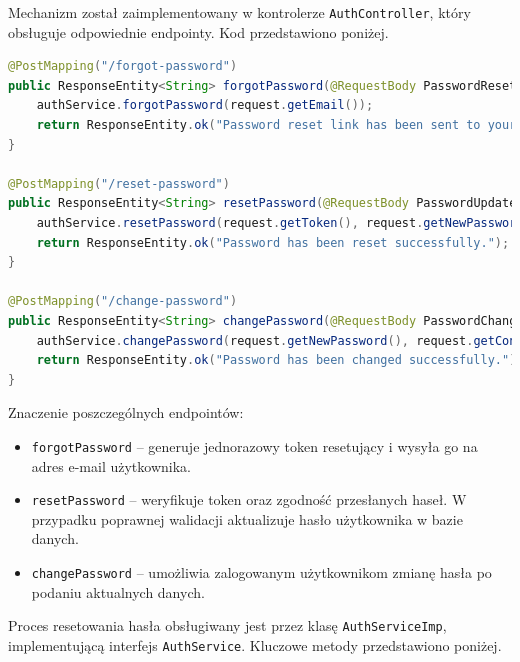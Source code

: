 Mechanizm został zaimplementowany w kontrolerze \texttt{AuthController}, który obsługuje odpowiednie endpointy. Kod przedstawiono poniżej.

\begin{lstlisting}[language=Java, style=JavaStyle, caption=Fragment klasy \texttt{AuthController}]
@PostMapping("/forgot-password")
public ResponseEntity<String> forgotPassword(@RequestBody PasswordResetRequest request) {
    authService.forgotPassword(request.getEmail());
    return ResponseEntity.ok("Password reset link has been sent to your email.");
}

@PostMapping("/reset-password")
public ResponseEntity<String> resetPassword(@RequestBody PasswordUpdateRequest request) {
    authService.resetPassword(request.getToken(), request.getNewPassword(), request.getConfirmPassword());
    return ResponseEntity.ok("Password has been reset successfully.");
}

@PostMapping("/change-password")
public ResponseEntity<String> changePassword(@RequestBody PasswordChangeRequest request) {
    authService.changePassword(request.getNewPassword(), request.getConfirmPassword(), request.getEmail());
    return ResponseEntity.ok("Password has been changed successfully.");
}
\end{lstlisting}

Znaczenie poszczególnych endpointów:
\begin{itemize}
    \item \texttt{forgotPassword} -- generuje jednorazowy token resetujący i wysyła go na adres e-mail użytkownika.
    \item \texttt{resetPassword} -- weryfikuje token oraz zgodność przesłanych haseł. W przypadku poprawnej walidacji aktualizuje hasło użytkownika w bazie danych.
    \item \texttt{changePassword} -- umożliwia zalogowanym użytkownikom zmianę hasła po podaniu aktualnych danych.
\end{itemize}

Proces resetowania hasła obsługiwany jest przez klasę \texttt{AuthServiceImp}, implementującą interfejs \texttt{AuthService}. Kluczowe metody przedstawiono poniżej.

